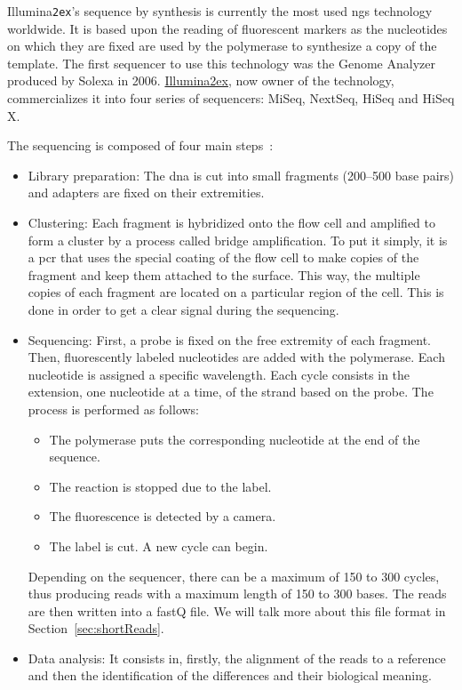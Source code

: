 Illumina\texttt{\tiny\raise2ex\hbox{\textregistered}}'s sequence by synthesis is currently the most used \gls{ngs} technology worldwide. It is based upon the reading of fluorescent markers as the nucleotides on which they are fixed are used by the polymerase to synthesize a copy of the template. The first sequencer to use this technology was the Genome Analyzer produced by Solexa in 2006. \href{http://www.illumina.com/}{Illumina\ttfamily\tiny\raise2ex\hbox{\textregistered}}, now owner of the technology, commercializes it into four series of sequencers: MiSeq, NextSeq, HiSeq and HiSeq X.

The sequencing is composed of four main steps~\cite{Illumina2008}:
\begin{itemize}
    \item Library preparation:
    The \gls{dna} is cut into small fragments (200--500 base pairs) and adapters are fixed on their extremities.
    \item Clustering:
    Each fragment is hybridized onto the flow cell and amplified to form a cluster by a process called bridge amplification.
    To put it simply, it is a \gls{pcr} that uses the special coating of the flow cell to make copies of the fragment and keep them attached to the surface. This way, the multiple copies of each fragment are located on a particular region of the cell. This is done in order to get a clear signal during the sequencing.
    \item Sequencing:
    First, a probe is fixed on the free extremity of each fragment. Then, fluorescently labeled nucleotides are added with the polymerase.
    Each nucleotide is assigned a specific wavelength.
    Each cycle consists in the extension, one nucleotide at a time, of the strand based on the probe. The process is performed as follows:
    \begin{itemize}
        \item The polymerase puts the corresponding nucleotide at the end of the sequence.
        \item The reaction is stopped due to the label.
        \item The fluorescence is detected by a camera.
        \item The label is cut. A new cycle can begin.
    \end{itemize}
    Depending on the sequencer, there can be a maximum of 150 to 300 cycles, thus producing reads with a maximum length of 150 to 300 bases.
    The reads are then written into a fastQ file. We will talk more about this file format in Section~\ref{sec:shortReads}.

    \item Data analysis:
    It consists in, firstly, the alignment of the reads to a reference and then the identification of the differences and their biological meaning.
\end{itemize}

